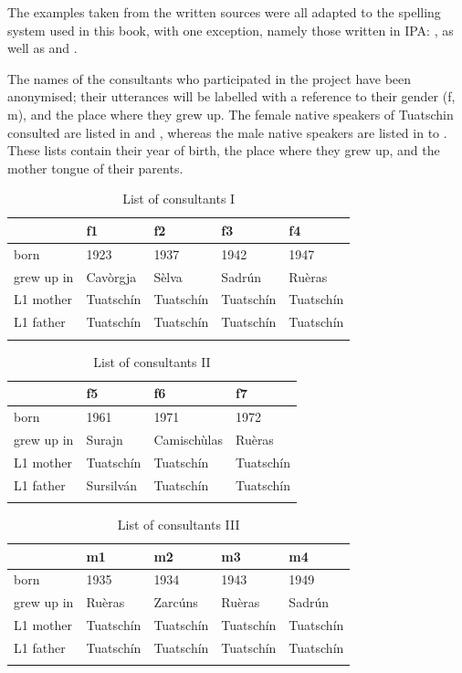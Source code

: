 The examples taken from the written sources were all adapted to the spelling system used in this book, with one exception, namely those written in IPA: \citet{Gartner1910}, as well as \citet{Valär2013a} and \citet{Valär2013b}.
  
The names of the consultants who participated in the project have been anonymised; their utterances will be labelled with a reference to their gender (f, m), and the place where they grew up. The female native speakers of Tuatschin consulted are listed in  and , whereas the male native speakers are listed in  to . These lists contain their year of birth, the place where they grew up, and the mother tongue of their parents.

\begin{table}
	\caption{List of consultants I}
	\label{tab:consultantsI}
	\begin{tabular}{lllll}
		\lsptoprule
		& f1 & f2 & f3 & f4\\
		\midrule
		born & 1923 & 1937 & 1942 & 1947\\
		grew up in & Cavòrgja & Sèlva & Sadrún & Ruèras \\
		L1 mother & Tuatschín & Tuatschín & Tuatschín & Tuatschín \\
		L1 father & Tuatschín & Tuatschín & Tuatschín & Tuatschín \\
		\lspbottomrule
	\end{tabular}
\end{table}

\begin{table}
	\caption{List of consultants II}
	\label{tab:consultantsII}
	\begin{tabular}{llll}
		\lsptoprule
		& f5 & f6 & f7 \\
		\midrule
		born &  1961 & 1971 & 1972 \\
		grew up in &  Surajn &  Camischùlas &  Ruèras  \\
		L1 mother & Tuatschín & Tuatschín & Tuatschín\\
		L1 father & Sursilván & Tuatschín & Tuatschín\\
		\lspbottomrule
	\end{tabular}
\end{table}

\begin{table}
	\caption{List of consultants III}
	\label{tab:consultantsIII}
	\begin{tabular}{lllll}
		\lsptoprule
		& m1 & m2 & m3 & m4\\
		\midrule
		born & 1935 & 1934 & 1943 & 1949 \\
		grew up in & Ruèras & Zarcúns & Ruèras & Sadrún\\
		L1 mother & Tuatschín & Tuatschín & Tuatschín & Tuatschín\\
		L1 father & Tuatschín & Tuatschín & Tuatschín & Tuatschín\\
		\lspbottomrule
	\end{tabular}
\end{table}

